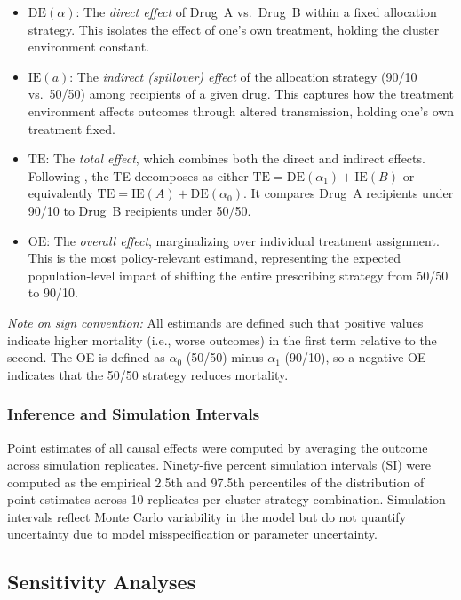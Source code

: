 \documentclass[preprint,11pt]{elsarticle}
\begin{document}
\begin{itemize}
  \item $\mathrm{DE}(\alpha)$: The \textit{direct effect} of Drug~A vs.\ Drug~B within a fixed allocation strategy. This isolates the effect of one's own treatment, holding the cluster environment constant.
  \item $\mathrm{IE}(a)$: The \textit{indirect (spillover) effect} of the allocation strategy (90/10 vs.\ 50/50) among recipients of a given drug. This captures how the treatment environment affects outcomes through altered transmission, holding one's own treatment fixed.
  \item $\mathrm{TE}$: The \textit{total effect}, which combines both the direct and indirect effects. Following \citet{hudgens_toward_2008}, the TE decomposes as either $\mathrm{TE} = \mathrm{DE}(\alpha_1) + \mathrm{IE}(B)$ or equivalently $\mathrm{TE} = \mathrm{IE}(A) + \mathrm{DE}(\alpha_0)$. It compares Drug~A recipients under 90/10 to Drug~B recipients under 50/50.
  \item $\mathrm{OE}$: The \textit{overall effect}, marginalizing over individual treatment assignment. This is the most policy-relevant estimand, representing the expected population-level impact of shifting the entire prescribing strategy from 50/50 to 90/10.
\end{itemize}

\textit{Note on sign convention:} All estimands are defined such that positive values indicate higher mortality (i.e., worse outcomes) in the first term relative to the second. The OE is defined as $\alpha_0$ (50/50) minus $\alpha_1$ (90/10), so a negative OE indicates that the 50/50 strategy reduces mortality.

\subsubsection{Inference and Simulation Intervals}

Point estimates of all causal effects were computed by averaging the outcome across simulation replicates. Ninety-five percent simulation intervals (SI) were computed as the empirical 2.5th and 97.5th percentiles of the distribution of point estimates across 10 replicates per cluster-strategy combination. Simulation intervals reflect Monte Carlo variability in the model but do not quantify uncertainty due to model misspecification or parameter uncertainty.

\subsection{Sensitivity Analyses}\label{sec:sa_methods}
\end{document}
